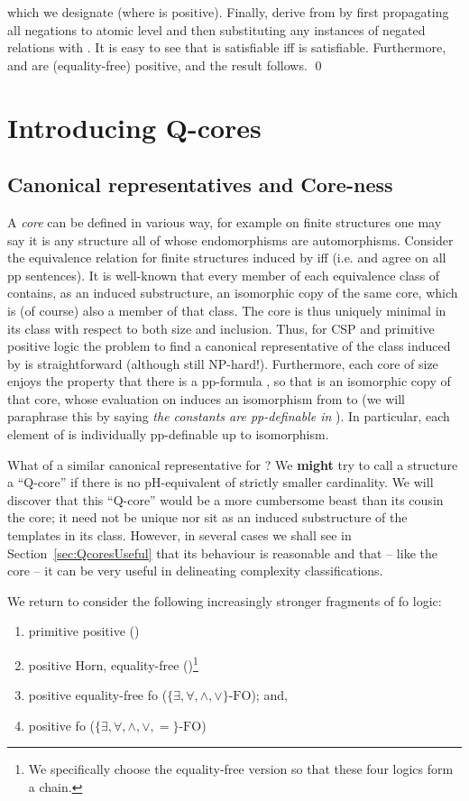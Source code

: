 \documentclass{LMCS}
\newcommand{\mylogic}{\ensuremath{\{\exists, \forall, \wedge,\vee \} \mbox{-}\mathrm{FO}}}
\newcommand{\posFO}{\ensuremath{\{\exists, \forall, \wedge,\vee,= \}
    \mbox{-}\mathrm{FO}}}
\begin{document}
which we designate  (where  is positive). Finally, derive  from  by first propagating all negations to atomic level and then substituting any instances of negated relations  with . It is easy to see that  is satisfiable iff  is satisfiable. Furthermore,  and  are (equality-free) positive, and the result follows.
\qed

\section{Introducing Q-cores}
\label{sec:Q-cores}

\subsection{Canonical representatives and Core-ness}
\label{sec:core-ness}

A \emph{core} can be defined in various way, for example on finite structures one may say it is any structure all of whose endomorphisms are automorphisms. Consider the equivalence relation  for finite structures induced by  iff   (\mbox{i.e.}  and  agree on all pp sentences). It is well-known that every member of each equivalence class of   contains, as an induced substructure, an isomorphic copy of the same core, which is (of course) also a member of that class. The core is thus uniquely minimal in its class with respect to both size and inclusion. Thus, for CSP and primitive positive logic the problem to find a canonical representative of the class induced by  is straightforward (although still NP-hard!). Furthermore, each core  of size  enjoys the property that there is a pp-formula , so that  is an  isomorphic copy of that core, whose evaluation on  induces an isomorphism from  to  (we will paraphrase this by saying \emph{the constants are pp-definable in }). In particular, each element of  is individually pp-definable up to isomorphism.

What of a similar canonical representative for  ? We \textbf{might} try to call a structure  a ``Q-core'' if there is no pH-equivalent  of strictly smaller cardinality. We will discover that this ``Q-core'' would be a more cumbersome beast than its cousin the core; it need not be unique nor sit as an induced substructure of the templates in its class. However, in several cases we shall see in Section~\ref{sec:QcoresUseful} that its behaviour is reasonable and that -- like the core -- it can be very useful in delineating complexity classifications. 

We return to consider the following increasingly stronger fragments of fo logic:
\begin{enumerate}
\item primitive positive ()
\item positive Horn, equality-free ()\footnote{We specifically choose the equality-free version so that these four logics form a chain.}
\item positive equality-free fo (\mylogic); and,
\item positive fo (\posFO)
\end{enumerate}
\end{document}
